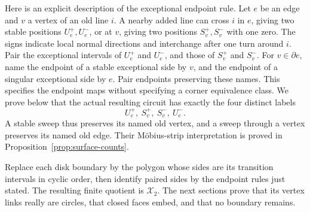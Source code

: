 \documentclass[11pt]{article}
\theoremstyle{definition}\newtheorem{definition}[theorem]{Definition}
\begin{document}
Here is an explicit description of the exceptional endpoint rule.
Let $e$ be an edge and $v$ a vertex of an old line $i$. A nearby added
line can cross $i$ in $e$, giving two stable positions $U_e^+,U_e^-$,
or at $v$, giving two positions $S_v^+,S_v^-$ with one zero.
The signs indicate local normal directions and interchange after
one turn around $i$. Pair the exceptional intervals of $U_e^+$ and
$U_e^-$, and those of $S_v^+$ and $S_v^-$.
For $v\in\partial e$, name the endpoint of a stable exceptional
side by $v$, and the endpoint of a singular exceptional side by $e$.
Pair endpoints preserving these names. This specifies the endpoint
maps without specifying a corner equivalence class. We prove below
that the actual resulting circuit has exactly the four distinct labels
\[
 U_e^+,\ S_v^+,\ S_v^-,\ U_e^-.
\]
A stable sweep thus preserves its named old vertex, and a sweep
through a vertex preserves its named old edge. Their M\"obius-strip
interpretation is proved in Proposition~\ref{prop:surface-counts}.

Replace each disk boundary by the polygon whose sides are its
transition intervals in cyclic order, then identify paired sides
by the endpoint rules just stated. The resulting finite quotient is
$\mathcal X_2$. The next sections prove that its vertex links really
are circles, that closed faces embed, and that no boundary remains.
\end{document}
